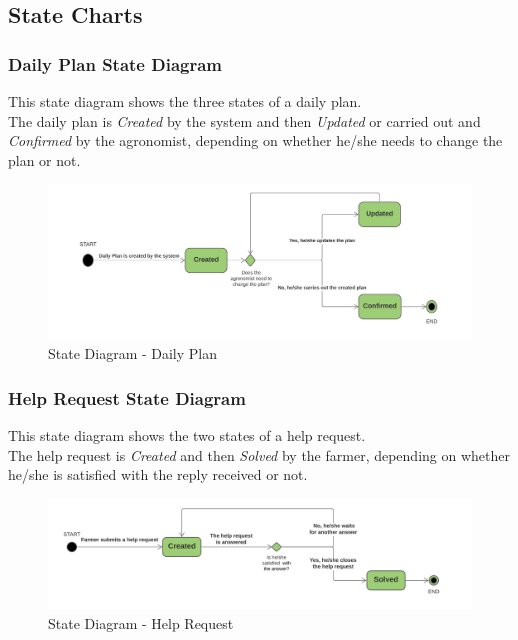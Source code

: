 \subsection{State Charts}

\subsubsection{Daily Plan State Diagram}
This state diagram shows the three states of a daily plan.\\
The daily plan is \textit{Created} by the system and then \textit{Updated} or carried out and \textit{Confirmed} by the agronomist, depending on whether he/she needs to change the plan or not.
\begin{figure}[h!]
  \includegraphics[width=\textwidth,height=\textheight,keepaspectratio]{./Images/State Chart DailyPlan.png}
  \caption{State Diagram - Daily Plan}
\end{figure}

\subsubsection{Help Request State Diagram}
This state diagram shows the two states of a help request.\\
The help request is \textit{Created} and then \textit{Solved} by the farmer, depending on whether he/she is satisfied with the reply received or not.
\begin{figure}[h!]
  \includegraphics[width=\textwidth,height=\textheight,keepaspectratio]{./Images/State Chart HelpRequest.png}
  \caption{State Diagram - Help Request}
\end{figure}

